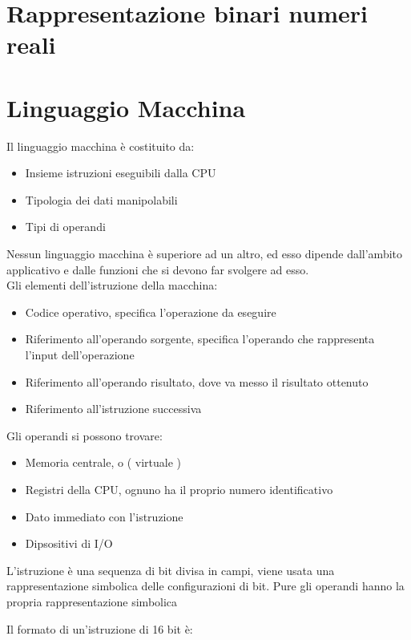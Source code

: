 \documentclass[12pt, a4paper]{report}
\begin{document}
\section{Rappresentazione binari numeri reali}

\section{Linguaggio Macchina}%
\label{sub:linguaggio_macchina}

Il linguaggio macchina è costituito da:
\begin{itemize}
	\item Insieme istruzioni eseguibili dalla CPU
	\item Tipologia dei dati manipolabili
	\item Tipi di operandi
\end{itemize}
Nessun linguaggio macchina è superiore ad un altro, ed esso dipende dall'ambito
applicativo e dalle funzioni che si devono far svolgere ad esso.\\
Gli elementi dell'istruzione della macchina:

\begin{itemize}
	\item Codice operativo, specifica l'operazione da eseguire
	\item Riferimento all'operando sorgente, specifica l'operando che 
		rappresenta l'input dell'operazione
	\item Riferimento all'operando risultato, dove va messo
		il risultato ottenuto
	\item Riferimento all'istruzione successiva
\end{itemize}

Gli operandi si possono trovare:

\begin{itemize}
	\item Memoria centrale, o ( virtuale ) 
	\item Registri della CPU, ognuno ha il proprio numero identificativo
	\item Dato immediato con l'istruzione
	\item Dipsositivi di I/O 
\end{itemize}

L'istruzione è una sequenza di bit divisa in campi, viene usata una 
rappresentazione simbolica delle configurazioni di bit. Pure gli operandi
hanno la propria rappresentazione simbolica

Il formato di un'istruzione di 16 bit è:
\end{document}
